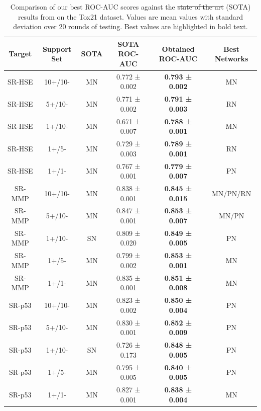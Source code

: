 \documentclass[journal=jcisd8,manuscript=article]{achemso} %
\providecommand{\DIFadd}[1]{{\protect\color{blue}\uwave{#1}}} %
\providecommand{\DIFdel}[1]{{\protect\color{red}\sout{#1}}}                      %
\providecommand{\DIFaddFL}[1]{\DIFadd{#1}} %
\providecommand{\DIFdelFL}[1]{\DIFdel{#1}} %
\providecommand{\DIFaddbeginFL}{} %
\providecommand{\DIFaddendFL}{} %
\providecommand{\DIFdelbeginFL}{} %
\providecommand{\DIFdelendFL}{} %
\begin{document}
\begin{table}[ht]
    \centering
    \begin{tabular}{@{}cccccc@{}}
    \hline
    \textbf{Target} & \textbf{Support Set} & \textbf{SOTA} & \textbf{SOTA ROC-AUC} & \textbf{Obtained ROC-AUC} & \textbf{Best Networks} \\
    \hline  
    SR-HSE & 10+/10- & MN & 0.772 ± 0.002 & \textbf{0.793 ± 0.002} & MN \\
    SR-HSE & 5+/10- & MN & 0.771 ± 0.002 & \textbf{0.791 ± 0.003} & RN \\
    SR-HSE & 1+/10- & MN & 0.671 ± 0.007 & \textbf{0.788 ± 0.001} & MN \\
    SR-HSE & 1+/5- & MN & 0.729 ± 0.003 & \textbf{0.789 ± 0.001} & RN \\
    SR-HSE & 1+/1- & MN & 0.767 ± 0.001 & \textbf{0.779 ± 0.007} & PN \\
    SR-MMP & 10+/10- & MN & 0.838 ± 0.001 & \textbf{0.845 ± 0.015} & MN/PN/RN \\
    SR-MMP & 5+/10- & MN & 0.847 ± 0.001 & \textbf{0.853 ± 0.007} & MN/PN \\
    SR-MMP & 1+/10- & SN & 0.809 ± 0.020 & \textbf{0.849 ± 0.005} & PN \\
    SR-MMP & 1+/5- & MN & 0.799 ± 0.002 & \textbf{0.853 ± 0.001} & MN \\
    SR-MMP & 1+/1- & MN & 0.835 ± 0.001 & \textbf{0.851 ± 0.008} & MN \\
    SR-p53 & 10+/10- & MN & 0.823 ± 0.002 & \textbf{0.850 ± 0.004} & PN \\
    SR-p53 & 5+/10- & MN & 0.830 ± 0.001 & \textbf{0.852 ± 0.009} & PN \\
    SR-p53 & 1+/10- & SN & 0.726 ± 0.173 & \textbf{0.848 ± 0.005} & PN \\
    SR-p53 & 1+/5- & MN & 0.795 ± 0.005 & \textbf{0.840 ± 0.005} & PN \\
    SR-p53 & 1+/1- & MN & 0.827 ± 0.001 & \textbf{0.838 ± 0.004} & MN \\
    \hline  
    \end{tabular}
    \caption[Comparing our best ROC-AUC scores with the SOTA results on Tox21.]{Comparison of our best ROC-AUC scores against the \DIFdelbeginFL \DIFdelFL{state of the art }\DIFdelendFL \DIFaddbeginFL \DIFaddFL{state-of-the-art }\DIFaddendFL (SOTA) results from \citet{altae2017low} on the Tox21 dataset. Values are mean values with standard deviation over 20 rounds of testing. Best values are highlighted in bold text.}
    \label{table:Tox21-sota-ours}
\end{table}
\end{document}
